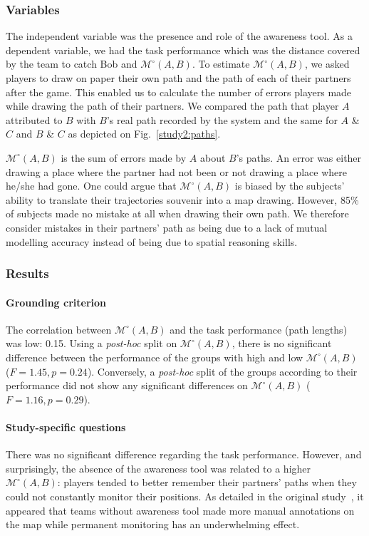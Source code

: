 \documentclass[natbib]{svjour3}
\newcommand{\gModel}[2]{{$\mathcal{M}^{\circ}(#1, #2)$}}
\begin{document}
\subsubsection*{Variables}

The independent variable was the presence and role of the awareness tool. As a
dependent variable, we had the task performance which was the distance covered
by the team to catch Bob and \gModel{A}{B}. To estimate \gModel{A}{B}, we asked
players to draw on paper their own path and the path of each of their partners
after the game. This enabled us to calculate the number of errors players made
while drawing the path of their partners. We compared the path that player $A$
attributed to $B$ with $B$'s real path recorded by the system and the same for
$A$ \& $C$ and $B$ \& $C$ as depicted on Fig.~\ref{study2:paths}. 

\gModel{A}{B} is the sum of errors made by $A$ about $B$'s paths. An error was
either drawing a place where the partner had not been or not drawing a place
where he/she had gone. One could argue that \gModel{A}{B} is biased by the
subjects' ability to translate their trajectories souvenir into a map drawing.
However, 85\% of subjects made no mistake at all when drawing their own path. We
therefore consider mistakes in their partners' path as being due to a lack of
mutual modelling accuracy instead of being due to spatial reasoning skills.

\subsubsection*{Results}

\paragraph{Grounding criterion} The correlation between \gModel{A}{B} and the
task performance (path lengths) was low: 0.15. Using a \emph{post-hoc} split on
\gModel{A}{B}, there is no significant difference between the performance of the
groups with high and low \gModel{A}{B}  ($F = 1.45, p = 0.24$). Conversely, a
\emph{post-hoc} split of the groups according to their performance did not show
any significant differences on \gModel{A}{B} ($F = 1.16, p = 0.29$).

\paragraph{Study-specific questions} There was no significant difference
regarding the task performance. However, and surprisingly, the absence of the
awareness tool was related to a higher \gModel{A}{B}: players tended to better
remember their partners' paths when they could not constantly monitor their
positions. As detailed in the original study~\citep{nova2005location}, it
appeared that teams without awareness tool made more manual annotations on the
map while permanent monitoring has an underwhelming effect.
\end{document}
